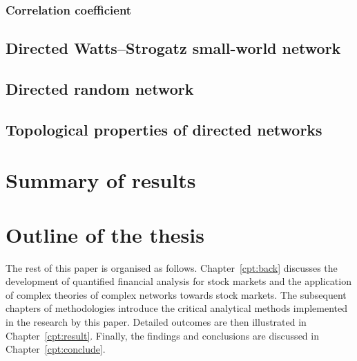 \subsubsection{Correlation coefficient}


\subsection{Directed Watts–Strogatz small-world network}



\subsection{Directed random network}

\subsection{Topological properties of directed networks}
\label{sec:aim}


\section{Summary of results}

\section{Outline of the thesis}
The rest of this paper is organised as follows. Chapter~\ref{cpt:back} discusses the development of quantified financial analysis for stock markets and the application of complex theories of complex networks towards stock markets. The subsequent chapters of methodologies introduce the critical analytical methods implemented in the research by this paper. Detailed outcomes are then illustrated in Chapter~\ref{cpt:result}. Finally, the findings and conclusions are discussed in Chapter~\ref{cpt:conclude}.
